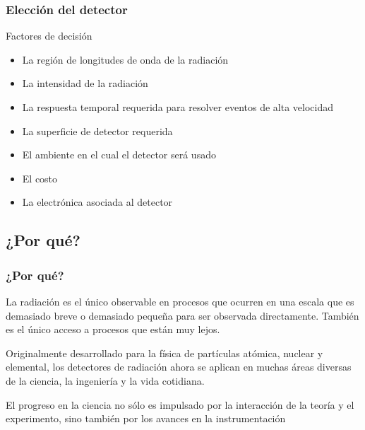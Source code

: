 \documentclass{beamer}
\begin{document}
\begin{frame}
\frametitle{Elección del detector}
\begin{alertblock}{Factores de decisión}
\begin{itemize}
\item La región de longitudes de onda de la radiación 
\item La intensidad de la radiación
\item La respuesta temporal requerida para resolver eventos de alta
velocidad
\item La superficie de detector requerida
\item El ambiente en el cual el detector será usado
\item El costo
\item La electrónica asociada al detector
\end{itemize}
\end{alertblock}
\end{frame} 

\subsection{¿Por qué?}

\begin{frame}
\frametitle{¿Por qué?}
{
\begin{block}{}
La radiación es el único {\color{red}observable} en procesos que ocurren en una escala que es
demasiado breve o demasiado pequeña para ser observada directamente. También es
el único acceso a procesos que están muy lejos.
\end{block}
}
\begin{block}{}
Originalmente desarrollado para la física de partículas atómica, nuclear y
elemental, los detectores de radiación ahora se aplican en muchas áreas diversas
de la ciencia, la ingeniería y la vida cotidiana.
\end{block}
{
\begin{block}{}
El progreso en la ciencia no sólo es impulsado por la interacción de la teoría y
el experimento, sino también por los avances en la {\color{blue}instrumentación}
\end{block}
}
\end{frame}
\end{document}
